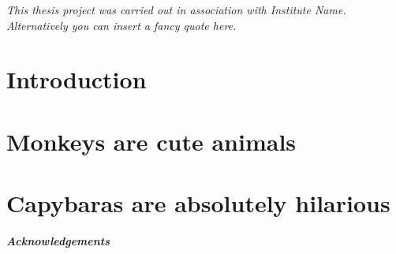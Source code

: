 \documentclass[twoside]{report} %
\begin{document}
\clearpage
\begin{flushright}
\textit{This thesis project was carried out in association with Institute Name. Alternatively you can insert a fancy quote here.}
\end{flushright}

\begin{abstract}
\lipsum[1]
\end{abstract}


\clearpage
\renewcommand{\abstractname}{Sommario}
\begin{abstract}
\lipsum[2]
\end{abstract}

\clearpage
\tableofcontents

\clearpage
\chapter{Introduction}
\label{ch1}


\clearpage
\chapter{Monkeys are cute animals}
\label{ch2}


\clearpage
\chapter{Capybaras are absolutely hilarious}
\label{ch3}


\clearpage
\begin{adjustwidth}{0cm}{4.5cm}
\begin{flushleft}
\textit{\textbf{Acknowledgements}}\\
\vspace{1cm}
\lipsum[3]
\end{flushleft}
\end{adjustwidth}

\clearpage


\glsaddall
\printnoidxglossary[type=\acronymtype,title=Acronyms,nonumberlist]

\clearpage

{}
\end{document}
